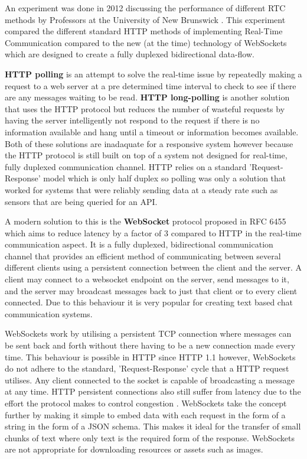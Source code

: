 An experiment was done in 2012 discussing the performance of different RTC methods by Professors at the University of New Brunswick \cite{websocket}. This experiment compared the different standard HTTP methods of implementing Real-Time Communication compared to the new (at the time) technology of WebSockets which are designed to create a fully duplexed bidirectional data-flow.

\textbf{HTTP polling} is an attempt to solve the real-time issue by repeatedly making a request to a web server at a pre determined time interval to check to see if there are any messages waiting to be read.  \textbf{HTTP long-polling} is another solution that uses the HTTP protocol but reduces the number of wasteful requests by having the server intelligently not respond to the request if there is no information available and hang until a timeout or information becomes available. Both of these solutions are inadaquate for a responsive system however because the HTTP protocol is still built on top of a system not designed for real-time, fully duplexed communication channel. HTTP relies on a standard 'Request-Response' model which is only half duplex so polling was only a solution that worked for systems that were reliably sending data at a steady rate such as sensors that are being queried for an API.

A modern solution to this is the \textbf{WebSocket} protocol proposed in RFC 6455 \cite{wsrfc} which aims to reduce latency by a factor of 3 compared to HTTP in the real-time communication aspect. It is a fully duplexed, bidirectional communication channel that provides an efficient method of communicating between several different clients using a persistent connection between the client and the server. A client may connect to a websocket endpoint on the server, send messages to it, and the server may broadcast messages back to just that client or to every client connected. Due to this behaviour it is very popular for creating text based chat communication systems.

WebSockets work by utilising a persistent TCP connection where messages can be sent back and forth without there having to be a new connection made every time. This behaviour is possible in HTTP since HTTP 1.1 however, WebSockets do not adhere to the standard, 'Request-Response' cycle that a HTTP request utilises. Any client connected to the socket is capable of broadcasting a message at any time. HTTP persistent connections also still suffer from latency due to the effort the protocol makes to control congestion \cite{httpvsws}. WebSockets take the concept further by making it simple to embed data with each request in the form of a string in the form of a JSON schema. This makes it ideal for the transfer of small chunks of text where only text is the required form of the response. WebSockets are not appropriate for downloading resources or assets such as images.

